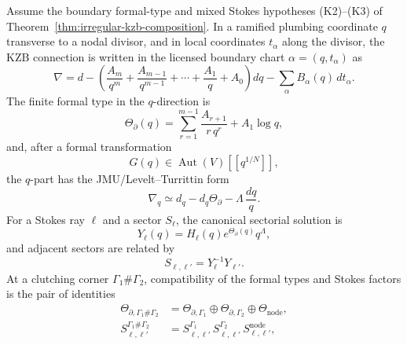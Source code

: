 \begin{proposition}
\label{prop:irregular-kzb-q-formal-type-stokes-cocycle}
\ClaimStatusConditional
Assume the boundary formal-type and mixed Stokes hypotheses
\textup{(K2)}--\textup{(K3)} of
Theorem~\ref{thm:irregular-kzb-composition}. In a ramified plumbing
coordinate \(q\) transverse to a nodal divisor, and in local
coordinates \(t_{\alpha}\) along the divisor, the KZB connection is
written in the licensed boundary chart \(\alpha=(q,t_{\alpha})\) as
\begin{equation}
\label{eq:irregular-kzb-boundary-connection-form}
\nabla
= d
-\left(
 \frac{A_{m}}{q^{m}}+\frac{A_{m-1}}{q^{m-1}}
 +\cdots+\frac{A_{1}}{q}+A_{0}
 \right)dq
-\sum_{\alpha}B_{\alpha}(q)\,dt_{\alpha}.
\end{equation}
The finite formal type in the \(q\)-direction is
\begin{equation}
\label{eq:irregular-kzb-boundary-formal-type}
\Theta_{\partial}(q)
=
\sum_{r=1}^{m-1}\frac{A_{r+1}}{r\,q^{r}}+A_{1}\log q,
\end{equation}
and, after a formal transformation
\[
 G(q)\in \operatorname{Aut}(V)[[q^{1/N}]],
\]
the \(q\)-part has the JMU/Levelt--Turrittin form
\begin{equation}
\label{eq:irregular-kzb-formal-gauge-form}
\nabla_{q}\simeq d_{q}-d_{q}\Theta_{\partial}
-\Lambda\,\frac{dq}{q}.
\end{equation}
For a Stokes ray \(\ell\) and a sector \(S_{\ell}\), the canonical
sectorial solution is
\begin{equation}
\label{eq:irregular-kzb-sectorial-solution}
Y_{\ell}(q)=H_{\ell}(q)e^{\Theta_{\partial}(q)}q^{\Lambda},
\end{equation}
and adjacent sectors are related by
\begin{equation}
\label{eq:irregular-kzb-stokes-matrix}
S_{\ell,\ell'}=Y_{\ell}^{-1}Y_{\ell'}.
\end{equation}
At a clutching corner \(\Gamma_{1}\#\Gamma_{2}\), compatibility of
the formal types and Stokes factors is the pair of identities
\begin{align}
\label{eq:irregular-kzb-clutching-formal-type}
\Theta_{\partial,\Gamma_{1}\#\Gamma_{2}}
&=
\Theta_{\partial,\Gamma_{1}}\oplus
\Theta_{\partial,\Gamma_{2}}\oplus
\Theta_{\mathrm{node}},\\
\label{eq:irregular-kzb-clutching-stokes-product}
S_{\ell,\ell'}^{\Gamma_{1}\#\Gamma_{2}}
&=
S_{\ell,\ell'}^{\Gamma_{1}}\,
S_{\ell,\ell'}^{\Gamma_{2}}\,
S_{\ell,\ell'}^{\mathrm{node}},

\end{align}
\end{proposition}
